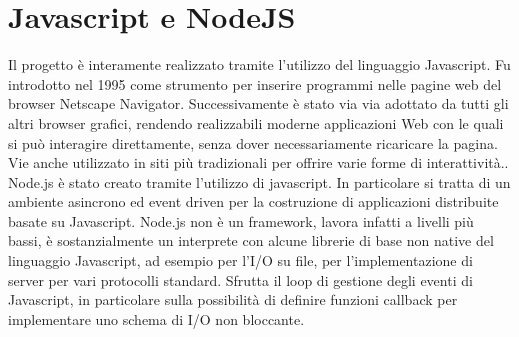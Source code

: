 \section{Javascript e NodeJS}
Il progetto è interamente realizzato tramite l'utilizzo del linguaggio Javascript. Fu introdotto nel 1995 come strumento per inserire programmi nelle pagine web del browser Netscape Navigator. Successivamente è stato via via adottato da tutti gli altri browser grafici, rendendo realizzabili moderne applicazioni Web con le quali si può interagire direttamente, senza dover necessariamente ricaricare la pagina. Vie anche utilizzato in siti più tradizionali per offrire varie forme di interattività.\cite{JS}. Node.js è stato creato tramite l'utilizzo di javascript. In particolare si tratta di un ambiente asincrono ed event driven per la costruzione di applicazioni distribuite basate su Javascript. Node.js non è un framework, lavora infatti a livelli più bassi, è sostanzialmente un interprete con alcune librerie di base non native del linguaggio Javascript, ad esempio per l’I/O su file, per l’implementazione di 
server per vari protocolli standard. Sfrutta il loop di gestione degli eventi di Javascript, in particolare sulla possibilità 
di definire funzioni callback per implementare uno schema di I/O non 
bloccante.

